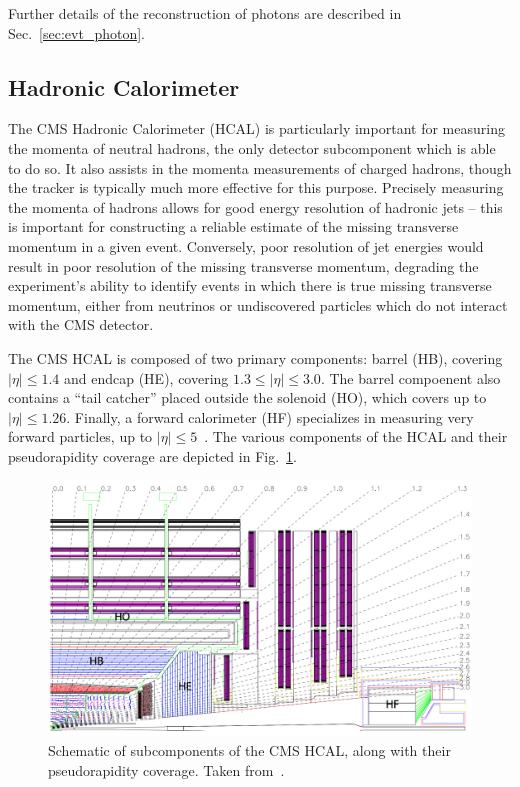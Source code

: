 Further details of the reconstruction of photons are described in Sec.~\ref{sec:evt_photon}.

\subsection{Hadronic Calorimeter} \label{sec:cms_hcal}
The CMS Hadronic Calorimeter (HCAL) is particularly important for measuring the momenta of neutral hadrons, the only detector subcomponent which is able to do so.
It also assists in the momenta measurements of charged hadrons, though the tracker is typically much more effective for this purpose.
Precisely measuring the momenta of hadrons allows for good energy resolution of hadronic jets -- this is important for constructing a reliable estimate of the missing transverse momentum in a given event.
Conversely, poor resolution of jet energies would result in poor resolution of the missing transverse momentum, degrading the experiment's ability to identify events in which there is true missing transverse momentum, either from neutrinos or undiscovered particles which do not interact with the CMS detector.

The CMS HCAL is composed of two primary components: barrel (HB), covering $|\eta| \leq 1.4$ and endcap (HE), covering $1.3 \leq |\eta| \leq 3.0$.
The barrel compoenent also contains a ``tail catcher'' placed outside the solenoid (HO), which covers up to $|\eta| \leq 1.26$.
Finally, a forward calorimeter (HF) specializes in measuring very forward particles, up to $|\eta| \leq 5$~\cite{Bayatian:2006nff}.
The various components of the HCAL and their pseudorapidity coverage are depicted in Fig.~\ref{fig:cms_hcal_schematic}.

\begin{figure} [htbp!]
    \centering
    \includegraphics[width=0.7\linewidth]{figures/cms/hcal_schematic.png}
    \caption{Schematic of subcomponents of the CMS HCAL, along with their pseudorapidity coverage. Taken from~\cite{Chatrchyan:2008aa}.}
    \label{fig:cms_hcal_schematic}
\end{figure}

